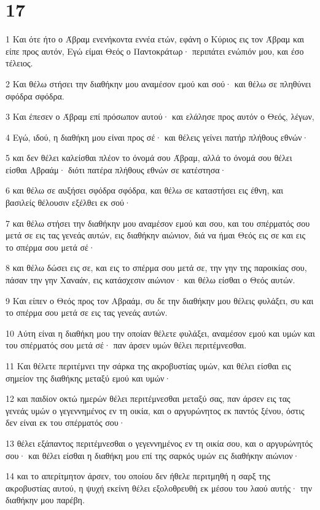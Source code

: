 \chapter{17}

\par 1 Και ότε ήτο ο Άβραμ ενενήκοντα εννέα ετών, εφάνη ο Κύριος εις τον Άβραμ και είπε προς αυτόν, Εγώ είμαι Θεός ο Παντοκράτωρ· περιπάτει ενώπιόν μου, και έσο τέλειος.
\par 2 Και θέλω στήσει την διαθήκην μου αναμέσον εμού και σού· και θέλω σε πληθύνει σφόδρα σφόδρα.
\par 3 Και έπεσεν ο Άβραμ επί πρόσωπον αυτού· και ελάλησε προς αυτόν ο Θεός, λέγων,
\par 4 Εγώ, ιδού, η διαθήκη μου είναι προς σέ· και θέλεις γείνει πατήρ πλήθους εθνών·
\par 5 και δεν θέλει καλείσθαι πλέον το όνομά σου Άβραμ, αλλά το όνομά σου θέλει είσθαι Αβραάμ· διότι πατέρα πλήθους εθνών σε κατέστησα·
\par 6 και θέλω σε αυξήσει σφόδρα σφόδρα, και θέλω σε καταστήσει εις έθνη, και βασιλείς θέλουσιν εξέλθει εκ σού·
\par 7 και θέλω στήσει την διαθήκην μου αναμέσον εμού και σου, και του σπέρματός σου μετά σε εις τας γενεάς αυτών, εις διαθήκην αιώνιον, διά να ήμαι Θεός εις σε και εις το σπέρμα σου μετά σέ·
\par 8 και θέλω δώσει εις σε, και εις το σπέρμα σου μετά σε, την γην της παροικίας σου, πάσαν την γην Χαναάν, εις κατάσχεσιν αιώνιον· και θέλω είσθαι ο Θεός αυτών.
\par 9 Και είπεν ο Θεός προς τον Αβραάμ, συ δε την διαθήκην μου θέλεις φυλάξει, συ και το σπέρμα σου μετά σε εις τας γενεάς αυτών.
\par 10 Αύτη είναι η διαθήκη μου την οποίαν θέλετε φυλάξει, αναμέσον εμού και υμών και του σπέρματός σου μετά σέ· παν άρσεν υμών θέλει περιτέμνεσθαι.
\par 11 Και θέλετε περιτέμνει την σάρκα της ακροβυστίας υμών, και θέλει είσθαι εις σημείον της διαθήκης μεταξύ εμού και υμών·
\par 12 και παιδίον οκτώ ημερών θέλει περιτέμνεσθαι μεταξύ σας, παν άρσεν εις τας γενεάς υμών ο γεγεννημένος εν τη οικία, και ο αργυρώνητος εκ παντός ξένου, όστις δεν είναι εκ του σπέρματός σου·
\par 13 θέλει εξάπαντος περιτέμνεσθαι ο γεγεννημένος εν τη οικία σου, και ο αργυρώνητός σου· και θέλει είσθαι η διαθήκη μου επί της σαρκός υμών εις διαθήκην αιώνιον·
\par 14 και το απερίτμητον άρσεν, του οποίου δεν ήθελε περιτμηθή η σαρξ της ακροβυστίας αυτού, η ψυχή εκείνη θέλει εξολοθρευθή εκ μέσου του λαού αυτής· την διαθήκην μου παρέβη.
